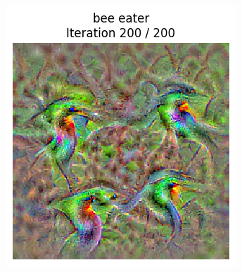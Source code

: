 \begin{figure}[H]
    \centering
    \begin{subfigure}{.33\textwidth}
        \centering
        \includegraphics[width=\linewidth]{SqueezeNet/bird_animated_reg++_last_frame.png}
        \caption{}
        \label{fig:class_viz_start_image:png_noise}
    \end{subfigure}%
    \begin{subfigure}{.33\textwidth}
        \centering

\end{subfigure}
\end{figure}
